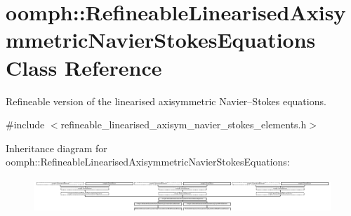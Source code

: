 \hypertarget{classoomph_1_1RefineableLinearisedAxisymmetricNavierStokesEquations}{}\section{oomph\+:\+:Refineable\+Linearised\+Axisymmetric\+Navier\+Stokes\+Equations Class Reference}
\label{classoomph_1_1RefineableLinearisedAxisymmetricNavierStokesEquations}


Refineable version of the linearised axisymmetric Navier--Stokes equations.  




{\ttfamily \#include $<$refineable\+\_\+linearised\+\_\+axisym\+\_\+navier\+\_\+stokes\+\_\+elements.\+h$>$}

Inheritance diagram for oomph\+:\+:Refineable\+Linearised\+Axisymmetric\+Navier\+Stokes\+Equations\+:\begin{figure}[H]
\begin{center}
\leavevmode
\includegraphics[height=1.314554cm]{classoomph_1_1RefineableLinearisedAxisymmetricNavierStokesEquations}
\end{center}
\end{figure}

